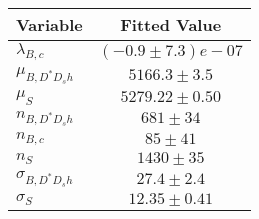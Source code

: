 \begin{tabular}[t]{lc}
\hline
Variable &Fitted Value\\
\hline\hline
$\lambda_{B,c}$&$(-0.9\pm7.3)e-07$\\
\hline
$\mu_{B, D^* D_s h}$&$5166.3\pm3.5$\\
\hline
$\mu_S$&$5279.22\pm0.50$\\
\hline
$n_{B, D^* D_s h}$&$681\pm34$\\
\hline
$n_{B,c}$&$85\pm41$\\
\hline
$n_S$&$1430\pm35$\\
\hline
$\sigma_{B, D^* D_s h}$&$27.4\pm2.4$\\
\hline
$\sigma_S$&$12.35\pm0.41$\\
\hline
\end{tabular}